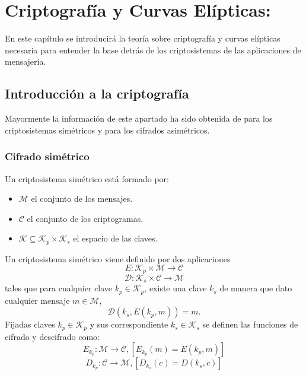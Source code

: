 \chapter{Criptografía y Curvas Elípticas:}

En este capítulo se introducirá la teoría sobre criptografía y curvas elípticas necesaria para entender la base detrás de los criptosistemas de las aplicaciones de mensajería.

\section{Introducción a la criptografía}
Mayormente la información de este apartado ha sido obtenida de \cite{GomezPardo2002b} para los criptosistemas simétricos y \cite{angelRiosMateos} para los cifrados asimétricos.

\subsection{Cifrado simétrico}
Un criptosistema simétrico está formado por:
\begin{itemize}
	\item $\mathcal{M}$ el conjunto de los mensajes.
	\item $\mathcal{C}$ el conjunto de los criptogramas.
	\item $\mathcal{K} \subseteq \mathcal{K}_p\times\mathcal{K}_s$ el espacio de las claves. 
\end{itemize}
Un criptosistema simétrico viene definido por dos aplicaciones
$$E:\mathcal{K}_p\times\mathcal{M}\rightarrow\mathcal{C}$$
$$\mathcal{D}:\mathcal{K}_s\times\mathcal{C}\rightarrow\mathcal{M}$$
tales que para cualquier clave $k_p \in \mathcal{K}_p$, existe una clave $k_s$ de manera que dato cualquier mensaje $m \in \mathcal{M}$,
$$
\mathcal{D}(k_s,E(k_p,m))=m.
$$
Fijadas claves $k_p \in \mathcal{K}_p$ y sus correspondiente $k_s \in \mathcal{K}_s$ se definen las funciones de cifrado y descifrado como:
$$
	E_{k_p}:\mathcal{M}\rightarrow\mathcal{C},[E_{k_p}(m)=E(k_p,m)]
$$
$$
	D_{k_p}:\mathcal{C}\rightarrow\mathcal{M},[D_{k_s}(c)=D(k_s,c)]
$$

